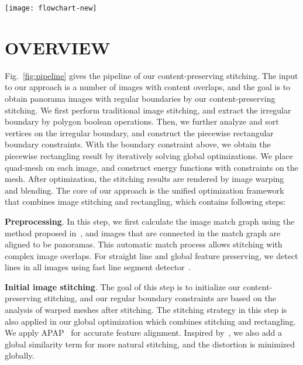 \documentclass[10pt,journal,compsoc]{IEEEtran}
\begin{document}
\begin{figure*}[t] %
  \centering
  \texttt{[image: flowchart-new]}
  \caption{Pipeline of  our stitching with regular boundary. (a) Input images. (b) initial stitching with irregular boundaries. (c) mesh of initial stitching. (d) outer boundary extracted by polygon boolean extraction. (e) irregular boundary extraction. (f) target regular boundary. (g) mesh of piecewise rectangling. (h) our result. (i) He et al.'s rectangular panorama.} \label{fig:pipeline}
\end{figure*}

 \section{OVERVIEW}
Fig.~\ref{fig:pipeline} gives the pipeline of our content-preserving stitching.
The input to our approach is a number of images with content overlaps, and the goal is to obtain panorama images with regular boundaries by our content-preserving stitching.
We first perform traditional image stitching, and extract the irregular boundary by polygon boolean operations.  Then, we further analyze and sort vertices on the irregular boundary, and construct the piecewise rectangular boundary constraints.
With the boundary constraint above, we obtain the piecewise rectangling result by iteratively solving global optimizations.
We place quad-mesh on each image, and construct energy functions with constraints on the mesh. After optimization, the stitching results are rendered by image warping and blending.
The core of our approach is the unified optimization framework that combines image stitching and rectangling, which contains following steps:

\textbf{Preprocessing}.
In this step, we first calculate the image match graph using the method proposed in~\cite{journals/ijcv/BrownL07}, and images that are connected in the match graph are aligned to be panoramas. This automatic match process allows stitching with complex image overlaps.
For straight line and global feature preserving, we detect lines in all images using fast line segment detector~\cite{journals/pami/GioiJMR10}.

\textbf{Initial image stitching}.
The goal of this step is to initialize our content-preserving stitching, and our regular boundary constraints are based on the analysis of warped meshes after stitching. The stitching strategy in this step is also applied in our global optimization which combines stitching and rectangling.
We apply APAP~\cite{journals/pami/ZaragozaCTBS14} for accurate feature alignment.
Inspired by~\cite{conf/eccv/ChenC16}, we also add a global similarity term for more natural stitching, and the distortion is minimized globally.
\end{document}
